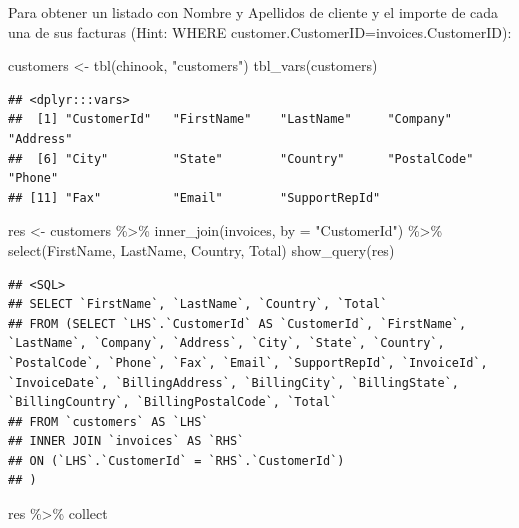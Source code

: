\documentclass[
]{book}
\newenvironment{Shaded}{\begin{snugshade}}{\end{snugshade}}
\newcommand{\AttributeTok}[1]{\textcolor[rgb]{0.77,0.63,0.00}{#1}}
\newcommand{\FunctionTok}[1]{\textcolor[rgb]{0.00,0.00,0.00}{#1}}
\newcommand{\NormalTok}[1]{#1}
\newcommand{\OtherTok}[1]{\textcolor[rgb]{0.56,0.35,0.01}{#1}}
\newcommand{\SpecialCharTok}[1]{\textcolor[rgb]{0.00,0.00,0.00}{#1}}
\newcommand{\StringTok}[1]{\textcolor[rgb]{0.31,0.60,0.02}{#1}}
\theoremstyle{break}
\theoremstyle{nonumberplain}
\begin{document}
Para obtener un listado con Nombre y Apellidos de cliente y el importe de cada una de sus facturas (Hint: WHERE customer.CustomerID=invoices.CustomerID):

\begin{Shaded}
\begin{Highlighting}[]
\NormalTok{customers }\OtherTok{\textless{}{-}} \FunctionTok{tbl}\NormalTok{(chinook, }\StringTok{"customers"}\NormalTok{)}
\FunctionTok{tbl\_vars}\NormalTok{(customers) }
\end{Highlighting}
\end{Shaded}

\begin{verbatim}
## <dplyr:::vars>
##  [1] "CustomerId"   "FirstName"    "LastName"     "Company"      "Address"     
##  [6] "City"         "State"        "Country"      "PostalCode"   "Phone"       
## [11] "Fax"          "Email"        "SupportRepId"
\end{verbatim}

\begin{Shaded}
\begin{Highlighting}[]
\NormalTok{res }\OtherTok{\textless{}{-}}\NormalTok{ customers }\SpecialCharTok{\%\textgreater{}\%} \FunctionTok{inner\_join}\NormalTok{(invoices, }\AttributeTok{by =} \StringTok{"CustomerId"}\NormalTok{) }\SpecialCharTok{\%\textgreater{}\%} \FunctionTok{select}\NormalTok{(FirstName, LastName, Country, Total) }
\FunctionTok{show\_query}\NormalTok{(res)}
\end{Highlighting}
\end{Shaded}

\begin{verbatim}
## <SQL>
## SELECT `FirstName`, `LastName`, `Country`, `Total`
## FROM (SELECT `LHS`.`CustomerId` AS `CustomerId`, `FirstName`, `LastName`, `Company`, `Address`, `City`, `State`, `Country`, `PostalCode`, `Phone`, `Fax`, `Email`, `SupportRepId`, `InvoiceId`, `InvoiceDate`, `BillingAddress`, `BillingCity`, `BillingState`, `BillingCountry`, `BillingPostalCode`, `Total`
## FROM `customers` AS `LHS`
## INNER JOIN `invoices` AS `RHS`
## ON (`LHS`.`CustomerId` = `RHS`.`CustomerId`)
## )
\end{verbatim}

\begin{Shaded}
\begin{Highlighting}[]
\NormalTok{res  }\SpecialCharTok{\%\textgreater{}\%}\NormalTok{ collect}
\end{Highlighting}
\end{Shaded}
\end{document}
